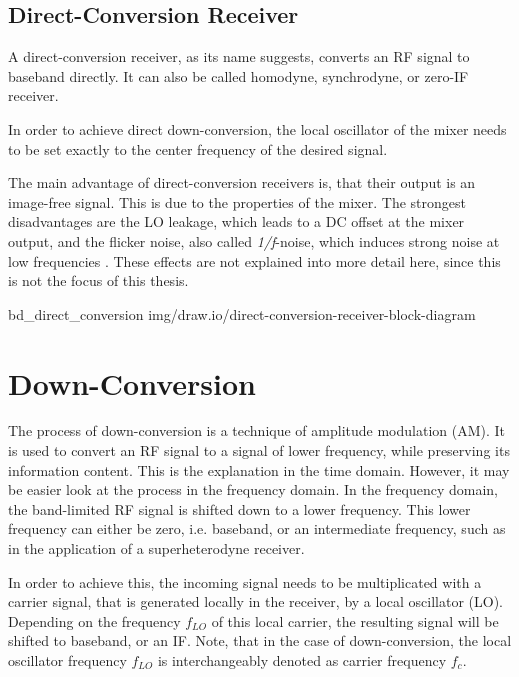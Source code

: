 \subsection{Direct-Conversion Receiver}

A direct-conversion receiver, as its name suggests, converts an RF signal to baseband directly.
It can also be called homodyne, synchrodyne, or zero-IF receiver.

In order to achieve direct down-conversion, the local oscillator of the mixer needs to be set exactly to the center frequency of the desired signal.

The main advantage of direct-conversion receivers is, that their output is an image-free signal.
This is due to the properties of the mixer.
The strongest disadvantages are the LO leakage, which leads to a DC offset at the mixer output, and the flicker noise, also called \textit{1/f}-noise, which induces strong noise at low frequencies \cite{PassosFábio2020AHSo}.
These effects are not explained into more detail here, since this is not the focus of this thesis.

 {bd_direct_conversion} {img/draw.io/direct-conversion-receiver-block-diagram}


\section{Down-Conversion}

The process of down-conversion is a technique of amplitude modulation (AM).
It is used to convert an RF signal to a signal of lower frequency, while preserving its information content.
This is the explanation in the time domain.
However, it may be easier look at the process in the frequency domain.
In the frequency domain, the band-limited RF signal is shifted down to a lower frequency.
This lower frequency can either be zero, i.e. baseband, or an intermediate frequency, such as in the application of a superheterodyne receiver.

In order to achieve this, the incoming signal needs to be multiplicated with a carrier signal, that is generated locally in the receiver, by a local oscillator (LO).
Depending on the frequency $f_{LO}$ of this local carrier, the resulting signal will be shifted to baseband, or an IF.
Note, that in the case of down-conversion, the local oscillator frequency $f_{LO}$ is interchangeably denoted as carrier frequency $f_c$.

